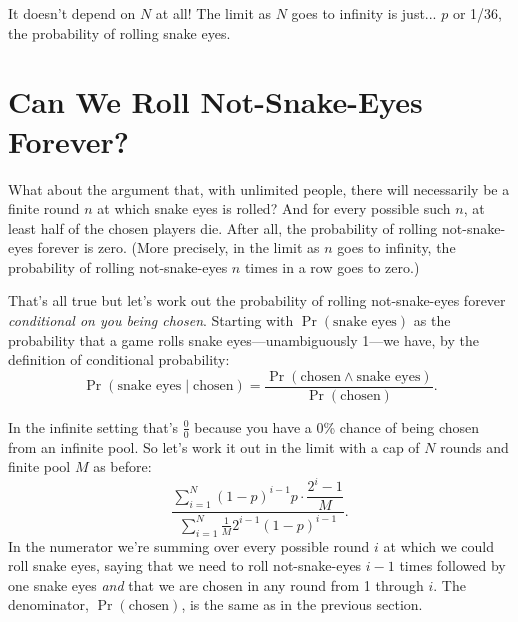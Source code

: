 \documentclass[article,twocolumn]{memoir}
\begin{document}
It doesn't depend on $N$ at all!
The limit as $N$ goes to infinity is just... 
$p$ or 1/36, the probability of rolling snake eyes.
\qedsymbol{}

\chapter{Can We Roll Not-Snake-Eyes Forever?}

What about the argument that, with unlimited people, there will necessarily be a finite round $n$ at which snake eyes is rolled?
And for every possible such $n$, at least half of the chosen players die.
After all, the probability of rolling not-snake-eyes forever is zero. 
(More precisely, in the limit as $n$ goes to infinity, the probability of rolling not-snake-eyes $n$ times in a row goes to zero.)

That's all true but let's work out the probability of rolling not-snake-eyes forever \emph{conditional on you being chosen}.
Starting with $\Pr(\text{snake eyes})$ as the probability that a game rolls snake eyes---unambiguously 1---we have, by the definition of conditional probability:
\begin{equation*}
\Pr(\text{snake eyes} \mid \text{chosen})
= \frac{\Pr(\text{chosen} \land \text{snake eyes})}{\Pr(\text{chosen})}.
\end{equation*}

In the infinite setting that's
$\tfrac{0}{0}$
because you have a 0\% chance of being chosen from an infinite pool.
So let's work it out in the limit with a cap of $N$ rounds and finite pool $M$ as before:
$$\dfrac
{\sum\limits_{i=1}^{N}(1-p)^{i-1}p \cdot\dfrac{2^i-1}{M}}
{\sum\limits_{i=1}^{N}\tfrac{1}{M} 2^{i-1}(1-p)^{i-1}}.
$$
In the numerator we're summing over every possible round $i$ at which we could roll snake eyes, saying that we need to roll not-snake-eyes $i-1$ times followed by one snake eyes \emph{and} that we are chosen in any round from 1 through $i$.
The denominator, $\Pr(\text{chosen})$, is the same as in the previous section.
\end{document}
